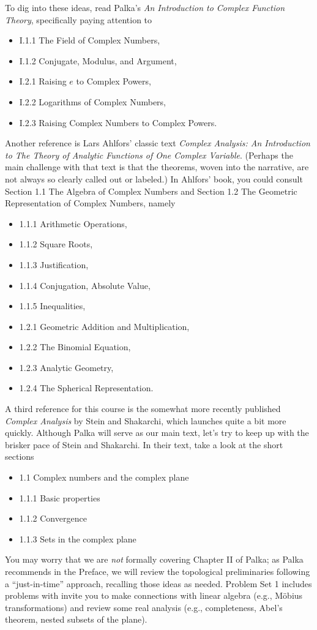 \documentclass{homework}
\begin{document}
To dig into these ideas, read Palka's \textit{An Introduction to
  Complex Function Theory}, specifically paying attention to
\begin{itemize}
\item I.1.1 The Field of Complex Numbers,
\item I.1.2 Conjugate, Modulus, and Argument,
\item I.2.1 Raising $e$ to Complex Powers,
\item I.2.2 Logarithms of Complex Numbers,
\item I.2.3 Raising Complex Numbers to Complex Powers.
\end{itemize}
Another reference is Lars Ahlfors' classic text \textit{Complex
  Analysis: An Introduction to The Theory of Analytic Functions of One
  Complex Variable}.  (Perhaps the main challenge with that text is
that the theorems, woven into the narrative, are not always so clearly
called out or labeled.)  In Ahlfors' book, you could consult
Section 1.1 The Algebra of Complex Numbers and Section 1.2 The Geometric Representation of Complex Numbers, namely
\begin{itemize}
\item 1.1.1 Arithmetic Operations,
\item 1.1.2 Square Roots,
\item 1.1.3 Justification,
\item 1.1.4 Conjugation, Absolute Value,
\item 1.1.5 Inequalities,
\item 1.2.1 Geometric Addition and Multiplication,
\item 1.2.2 The Binomial Equation,
\item 1.2.3 Analytic Geometry,
\item 1.2.4 The Spherical Representation.
\end{itemize}
A third reference for this course is the somewhat more recently
published \textit{Complex Analysis} by Stein and Shakarchi, which
launches quite a bit more quickly.  Although Palka will serve as our
main text, let's try to keep up with the brisker pace of Stein and
Shakarchi.  In their text, take a look at the short sections
\begin{itemize}
\item 1.1 Complex numbers and the complex plane
\item 1.1.1 Basic properties
\item 1.1.2 Convergence
\item 1.1.3 Sets in the complex plane
\end{itemize}
You may worry that we are \textit{not} formally covering Chapter II of
Palka; as Palka recommends in the Preface, we will review the
topological preliminaries following a ``just-in-time'' approach,
recalling those ideas as needed.  Problem Set 1 includes problems with
invite you to make connections with linear algebra (e.g., M\"obius
transformations) and review some real analysis (e.g., completeness,
Abel's theorem, nested subsets of the plane).
\end{document}
